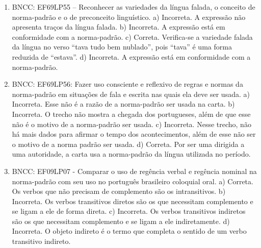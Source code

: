\begin{enumerate}
\item
BNCC: EF69LP55 -- Reconhecer as variedades da língua falada, o conceito de norma-padrão e o de preconceito linguístico. a) Incorreta. A expressão não apresenta traços da língua falada. b) Incorreta. A expressão está em conformidade com a norma-padrão. c) Correta. Verifica-se a variedade falada da língua no verso ``tava tudo bem nublado'', pois ``tava'' é uma forma reduzida de ``estava''. d) Incorreta. A expressão está em conformidade com a norma-padrão.

\item
BNCC: EF69LP56: Fazer uso consciente e reflexivo de regras e normas da norma-padrão em situações de fala e escrita nas quais ela deve ser usada. a) Incorreta. Esse não é a razão de a norma-padrão ser usada na carta. b) Incorreta. O trecho não mostra a chegada dos portugueses, além de que esse não é o motivo de a norma-padrão ser usada. c) Incorreta. Nesse trecho, não há mais dados para afirmar o tempo dos acontecimentos, além de esse não ser o motivo de a norma padrão ser usada. d) Correta. Por ser uma dirigida a uma autoridade, a carta usa a norma-padrão da língua utilizada no período.

\item
BNCC: EF09LP07 - Comparar o uso de regência verbal e regência nominal na norma-padrão com seu uso no português brasileiro coloquial oral. a) Correta. Os verbos que não precisam de complemento são os intransitivos. b) Incorreta. Os verbos transitivos diretos são os que necessitam complemento e se ligam a ele de forma direta. c) Incorreta. Os verbos transitivos indiretos são os que necessitam complemento e se ligam a ele indiretamente. d) Incorreta. O objeto indireto é o termo que completa o sentido de um
verbo transitivo indireto.
\end{enumerate}


